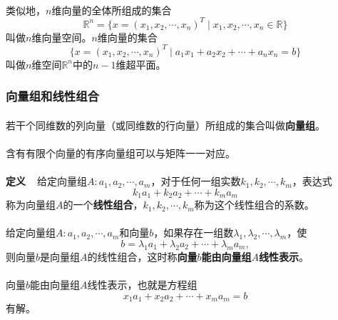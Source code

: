 \paragraph{}
类似地，$n$维向量的全体所组成的集合
\begin{equation*}
  \mathbb{R}^n = \{x=(x_1,x_2,\cdots,x_n)^T \;|\; x_1,x_2,\cdots,x_n\in\mathbb{R}\}
\end{equation*}
叫做$n$维向量空间。$n$维向量的集合
\begin{equation*}
  \{x=(x_1,x_2,\cdots,x_n)^T \;|\; a_1x_1+a_2x_2+\cdots+a_nx_n=b\}
\end{equation*}
叫做$n$维空间$\mathbb{R}^n$中的$n-1$维超平面。

\subsubsection{向量组和线性组合}
\paragraph{}
若干个同维数的列向量（或同维数的行向量）所组成的集合叫做\textbf{向量组}。

\paragraph{}
含有有限个向量的有序向量组可以与矩阵一一对应。

\paragraph{}
\textbf{定义~~}给定向量组$A: a_1, a_2, \cdots, a_m$，对于任何一组实数$k_1,k_2,\cdots,k_m$，表达式
\begin{equation*}
  k_1a_1+k_2a_2+\cdots+k_ma_m
\end{equation*}
称为向量组$A$的一个\textbf{线性组合}，$k_1,k_2,\cdots,k_m$称为这个线性组合的系数。

\paragraph{}
给定向量组$A: a_1,a_2,\cdots,a_m$和向量$b$，如果存在一组数$\lambda_1,\lambda_2,\cdots,\lambda_m$，使
\begin{equation*}
  b=\lambda_1a_1 + \lambda_2a_2 + \cdots + \lambda_ma_m,
\end{equation*}
则向量$b$是向量组$A$的线性组合，这时称\textbf{向量$b$能由向量组$A$线性表示}。

\paragraph{}
向量$b$能由向量组$A$线性表示，也就是方程组
\begin{equation*}
  x_1a_1+x_2a_2+\cdots+x_ma_m=b
\end{equation*}
有解。

